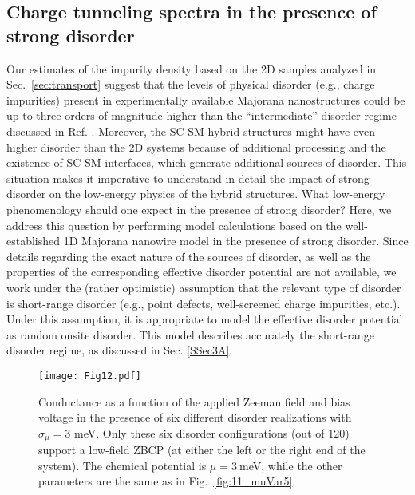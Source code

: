 \documentclass[aps,prmaterials,twocolumn,superscriptaddress,longbibliography]{revtex4-2}
\begin{document}
\subsection{Charge tunneling spectra in the presence of strong disorder} \label{SSec3B}    %

Our estimates of the impurity density based on the 2D samples analyzed in Sec.~\ref{sec:transport} suggest that the levels of physical disorder (e.g., charge impurities) present in experimentally available  Majorana nanostructures could be up to three orders of magnitude higher than the ``intermediate'' disorder regime discussed in Ref. . Moreover, the SC-SM hybrid structures might have even higher disorder than the 2D systems because of additional processing and the existence of SC-SM interfaces, which generate additional sources of disorder. This situation makes it imperative to understand in detail the impact of strong disorder on the low-energy physics of the hybrid structures. What low-energy phenomenology should one expect in the presence of strong disorder? Here, we address this question by performing model calculations based on the well-established 1D Majorana nanowire model in the presence of strong disorder. Since details regarding the exact nature of the sources of disorder, as well as the properties of the corresponding effective disorder potential are not available, we work under the (rather optimistic) assumption that the relevant type of disorder is short-range disorder (e.g., point defects, well-screened charge impurities, etc.). Under this assumption, it is appropriate to model the effective disorder potential as random onsite disorder. This model describes accurately the short-range disorder regime, as discussed in Sec. \ref{SSec3A}. 

\begin{figure*}[t]
    \centering
    \texttt{[image: Fig12.pdf]}
    \caption{Conductance as a function of the applied  Zeeman field and bias voltage in the presence of six different disorder realizations with $\sigma_\mu=3$ meV. Only these six disorder configurations (out of 120) support a low-field ZBCP (at either the left or the right end of the system). 
   The chemical potential is $\mu=3~$meV, while the other parameters are the same as in Fig.~\ref{fig:11_muVar5}.}
    \label{fig:12_muVar3}
\end{figure*}
\end{document}
